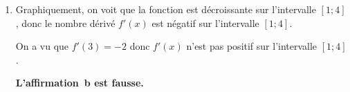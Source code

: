 \begin{enumerate}
\begin{enumerate}
	Sur l'intervalle $[-3 ; 5]$,\quad $0,5x + 1,5 \geqslant 0$ \quad  et \quad $-x+5 \geqslant 0$

	donc le produit \quad $(0,5x + 1,5)(-x+5)$ \quad est positif.

	\textbf{L'affirmation~a est fausse.}

	\item Graphiquement, on voit que la fonction est décroissante sur l'intervalle $[1 ; 4]$, donc le nombre dérivé $f'(x)$ est négatif sur l'intervalle $[1 ; 4]$.

	On a vu que \quad $f'(3) = -2$ \quad donc $f'(x)$ n'est pas positif sur l'intervalle $[1 ; 4]$.

	\textbf{L'affirmation~b est fausse.}
	\end{enumerate}
\end{enumerate}
